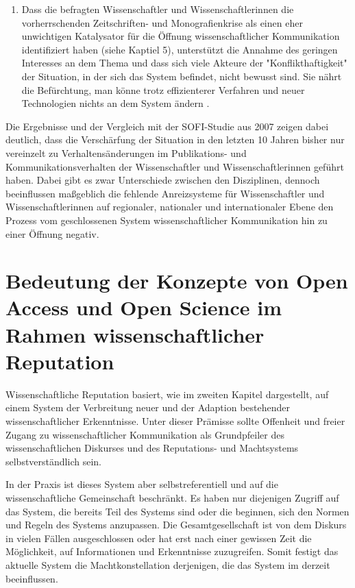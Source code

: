 \begin{enumerate}
\item Dass die befragten Wissenschaftler und Wissenschaftlerinnen die vorherrschenden Zeitschriften- und Monografienkrise als einen eher unwichtigen Katalysator für die Öffnung wissenschaftlicher Kommunikation identifiziert haben (siehe Kaptiel 5), unterstützt die Annahme des geringen Interesses an dem Thema und dass sich viele Akteure der "Konflikthaftigkeit" \cite{Kaldewey_2010} der Situation, in der sich das System befindet, nicht bewusst sind. Sie nährt die Befürchtung, man könne trotz effizienterer Verfahren und neuer Technologien nichts an dem System ändern \cite{Parks_2002}.
\end{enumerate}

Die Ergebnisse und der Vergleich mit der SOFI-Studie aus 2007 zeigen dabei deutlich, dass die Verschärfung der Situation in den letzten 10 Jahren bisher nur vereinzelt zu Verhaltensänderungen im Publikations- und Kommunikationsverhalten der Wissenschaftler und Wissenschaftlerinnen geführt haben. Dabei gibt es zwar Unterschiede zwischen den Disziplinen, dennoch beeinflussen maßgeblich die fehlende Anreizsysteme für Wissenschaftler und Wissenschaftlerinnen auf regionaler, nationaler und internationaler Ebene den Prozess vom geschlossenen System wissenschaftlicher Kommunikation hin zu einer Öffnung negativ.

\section{Bedeutung der Konzepte von Open Access und Open Science im Rahmen wissenschaftlicher Reputation}

Wissenschaftliche Reputation basiert, wie im zweiten Kapitel dargestellt, auf einem System der Verbreitung neuer und der Adaption bestehender wissenschaftlicher Erkenntnisse. Unter dieser Prämisse sollte Offenheit und freier Zugang zu wissenschaftlicher Kommunikation als Grundpfeiler des wissenschaftlichen Diskurses und des Reputations- und Machtsystems selbstverständlich sein.

In der Praxis ist dieses System aber selbstreferentiell und auf die wissenschaftliche Gemeinschaft beschränkt. Es haben nur diejenigen Zugriff auf das System, die bereits Teil des Systems sind oder die beginnen, sich den Normen und Regeln des Systems anzupassen. Die Gesamtgesellschaft ist von dem Diskurs in vielen Fällen ausgeschlossen oder hat erst nach einer gewissen Zeit die Möglichkeit, auf Informationen und Erkenntnisse zuzugreifen. Somit festigt das aktuelle System die Machtkonstellation derjenigen, die das System im derzeit beeinflussen.

